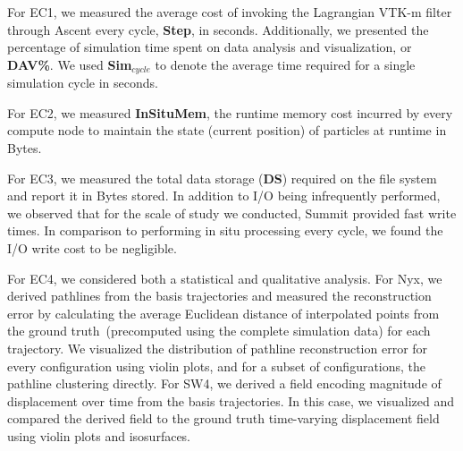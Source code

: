 For EC1, we measured the average cost of invoking the Lagrangian VTK-m filter through Ascent every cycle, \textbf{Step}, in seconds. Additionally, we presented the percentage of simulation time spent on data analysis and visualization, or \textbf{DAV\%}.
%
We used \textbf{Sim$_{cycle}$} to denote the average time required for a single simulation cycle in seconds.

For EC2, we measured \textbf{InSituMem}, the runtime memory cost incurred by every compute node to maintain the state (current position) of particles at runtime in Bytes.
%

For EC3, we measured the total data storage (\textbf{DS}) required on the file system and report it in Bytes stored.
%
In addition to I/O being infrequently performed, we observed that for the scale of study we conducted, Summit provided fast write times.
%
In comparison to performing in situ processing every cycle, we found the I/O write cost to be negligible. %

For EC4, we considered both a statistical and qualitative analysis. 
%
For Nyx, we derived pathlines from the basis trajectories and measured the reconstruction error by calculating the average Euclidean distance of interpolated points from the ground truth~(precomputed using the complete simulation data) for each trajectory.
%
We visualized the distribution of pathline reconstruction error for every configuration using violin plots, and for a subset of configurations, the pathline clustering directly.
%
For SW4, we derived a field encoding magnitude of displacement over time from the basis trajectories.
%
In this case, we visualized and compared the derived field to the ground truth time-varying displacement field using violin plots and isosurfaces.
%
